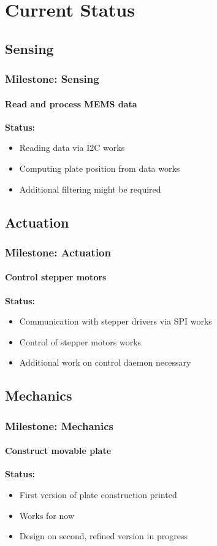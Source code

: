 \documentclass{beamer}
\begin{document}
\section{Current Status}
\subsection{Sensing}
\begin{frame}
  \frametitle{Milestone: Sensing}
  \framesubtitle{Read and process MEMS data}
  \textbf{Status:}
  \begin{itemize}
    \item Reading data via I2C works
    \item Computing plate position from data works
    \item Additional filtering might be required
  \end{itemize}
\end{frame}

\subsection{Actuation}
\begin{frame}
  \frametitle{Milestone: Actuation}
  \framesubtitle{Control stepper motors}
  \textbf{Status:}
  \begin{itemize}
    \item Communication with stepper drivers via SPI works
    \item Control of stepper motors works
    \item Additional work on control daemon necessary
  \end{itemize}
\end{frame}

\subsection{Mechanics}
\begin{frame}
  \frametitle{Milestone: Mechanics}
  \framesubtitle{Construct movable plate}
  \textbf{Status:}
  \begin{itemize}
    \item First version of plate construction printed
    \item Works for now
    \item Design on second, refined version in progress
  \end{itemize}
\end{frame}
\end{document}
